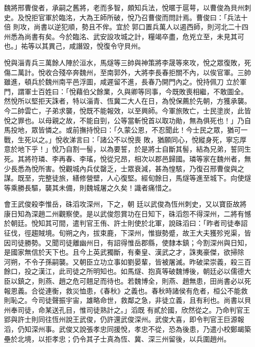\begin{pinyinscope}
 魏將邢曹俊者，承嗣之舊將，老而多智，頗知兵法，悅暱于扈萼，以曹俊為貝州刺史。及悅拒官軍於臨洺，大為王師所破，悅乃召曹俊而問計焉。曹俊曰：「兵法十倍
 則攻，尚書以逆犯順，勢且不侔。宜於郭口置兵萬人以遏西師，則河北二十四州悉為尚書有矣。今於臨洺、武安設攻城之計，糧竭卒盡，危兇立至，未見其可也。」祐等以其異己，咸譖毀，悅復令守貝州。



 悅與淄青兵三萬餘人陣於洹水，馬燧等三帥與神策將李晟等來攻，悅之眾復敗，死傷二萬計。悅收合殘卒奔魏州，至南郭外，大將李長春拒關不內，以俟官軍。三帥雖進，頓兵於魏州南平邑浮圖，咸遲留不進，長春乃開門內之。悅持佩刀
 立於軍門，謂軍士百姓曰：「悅藉伯父餘業，久與卿等同事，今既敗喪相繼，不敢圖全。然悅所以堅拒天誅者，特以淄青、恆冀二大人在日，為悅保薦於先朝，方獲承襲。今二帥雲亡，子弟求襲，悅既不能報效，以至興師。今軍旅敗亡，士民塗炭，此皆悅之罪也。以母親之故，不能自剄，公等當斬悅首以取功勛，無為俱死也！」乃自馬投地，眾皆憐之。或前撫持悅曰：「久蒙公恩，不忍聞此！今士民之眾，猶可一戰，生死以之。」悅收涕言曰：「諸公不以悅喪
 敗，猶願同心，悅縱身死，寧忘厚意於地下乎！」悅乃自割一髻，以為要誓，於是將士自斷其髻，結為兄弟，誓同生死。其將符璘、李再春、李瑤，悅從兄昂，相次以郡邑歸國。璘等家在魏州者，無少長悉為悅所害。悅觀城內兵仗罄乏，士眾衰減，甚為惶駭，乃復召邢曹俊與之謀。既至，完整徒旅，繕修營壁，人心復堅。經旬餘日，馬燧等進至城下。向使燧等乘勝長驅，襲其未備，則魏城屠之久矣！識者痛惜之。



 會王武俊殺李惟岳，硃滔攻深州，下之，朝
 廷以武俊為恆州刺史，又以寶臣故將康日知為深趙二州觀察使。是以武俊怨賞功在日知下，硃滔怨不得深州，二將有憾於朝廷。悅知其可間，遣判官王侑、許士則使於北軍，說硃滔曰：「昨者司徒奉詔征伐，徑趨賊境。旬朔之內，拔束鹿，下深州，惟嶽勢蹙，故王大夫獲殄兇渠，皆因司徒勝勢。又聞司徒離幽州日，有詔得惟岳郡縣，使隸本鎮；今割深州與日知，是國家無信於天下也。且今上英武獨斷，有秦皇、漢武之才，誅夷豪傑，欲掃除
 河朔，不令子孫嗣襲。又朝臣立功立事如劉晏輩，皆被屠滅。昨破梁崇義，殺三百餘口，投之漢江，此司徒之所明知也。如馬燧、抱真等破魏博後，朝廷必以儒德大臣以鎮之，則燕、趙之危可翹足而待也。若魏博全，則燕、趙無患，田尚書必以死報恩義。合從連衡，救災恤患，《春秋》之義也。春秋時諸侯有危者，桓公不能救則恥之。今司徒聲振宇宙，雄略命世，救鄰之急，非徒立義，且有利也。尚書以貝州奉司徒，命某送孔目，惟司徒熟計之。」滔既
 有貳於國，欣然從之。乃命判官王郢與許士則同往恆州說王武俊，仍許還武俊深州。武俊大喜，即令判官王巨源報滔，仍知深州事。武俊又說張孝忠同援悅，孝忠不從，恐為後患，乃遣小校鄭朅築壘於北境，以拒孝忠；仍令其子士真為恆、冀、深三州留後，以兵圍趙州。




\end{pinyinscope}
